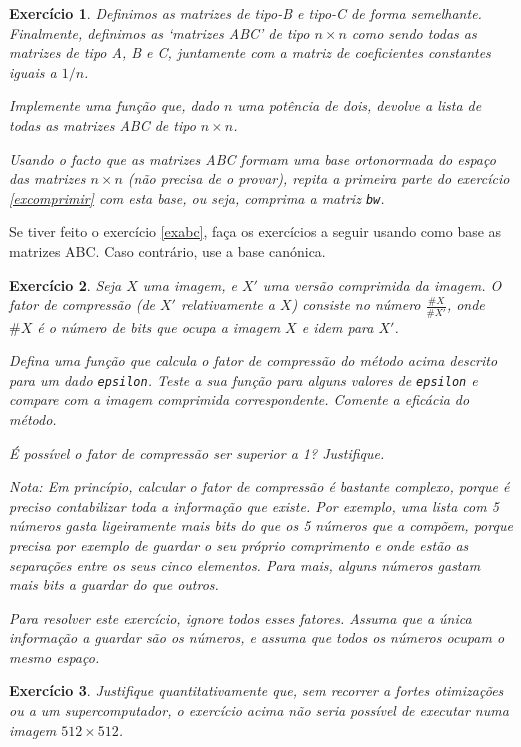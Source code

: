 \documentclass{article}
\newtheorem{ex}{Exercício}
\begin{document}
\begin{ex}
Definimos as matrizes de tipo-B e tipo-C de forma semelhante. Finalmente, definimos as `matrizes ABC' de tipo $n \times n$ como sendo todas as matrizes de tipo A, B e C, juntamente com a matriz de coeficientes constantes iguais a $1/n$.

Implemente uma função que, dado $n$ uma potência de dois, devolve a lista de todas as matrizes ABC de tipo $n \times n$.

Usando o facto que as matrizes ABC formam uma base ortonormada do espaço das matrizes $n \times n$ (não precisa de o provar), repita a primeira parte do exercício \ref{excomprimir} com esta base, ou seja, comprima a matriz \texttt{bw}. 
\end{ex}

Se tiver feito o exercício \ref{exabc}, faça os exercícios a seguir usando como base as matrizes ABC. Caso contrário, use a base canónica.

\begin{ex}
Seja $X$ uma imagem, e $X'$ uma versão comprimida da imagem. O fator de compressão (de $X'$ relativamente a $X$) consiste no número $\frac{\#X}{\#X'}$, onde $\#X$ é o número de bits que ocupa a imagem $X$ e idem para $X'$.

Defina uma função que calcula o fator de compressão do método acima descrito para um dado \texttt{epsilon}. Teste a sua função para alguns valores de \texttt{epsilon} e compare com a imagem comprimida correspondente. Comente a eficácia do método.

É possível o fator de compressão ser superior a 1? Justifique.

\smallskip

Nota: Em princípio, calcular o fator de compressão é bastante complexo, porque é preciso contabilizar toda a informação que existe. Por exemplo, uma lista com 5 números gasta ligeiramente mais bits do que os 5 números que a compõem, porque precisa por exemplo de guardar o seu próprio comprimento e onde estão as separações entre os seus cinco elementos. Para mais, alguns números gastam mais bits a guardar do que outros.

Para resolver este exercício, ignore todos esses fatores. Assuma que a única informação a guardar são os números, e assuma que todos os números ocupam o mesmo espaço.
\end{ex}

\begin{ex}
Justifique quantitativamente que, sem recorrer a fortes otimizações ou a um supercomputador, o exercício acima não seria possível de executar numa imagem $512 \times 512$.
\end{ex}
\end{document}
